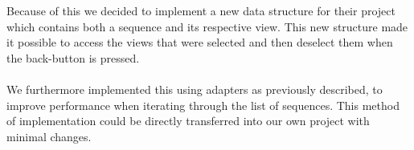 \\\\ 
Because of this we decided to implement a new data structure for their project which contains both a sequence and its respective view. This new structure made it possible to access the views that were selected and then deselect them when the back-button is pressed. 
\\\\
We furthermore implemented this using adapters as previously described, to improve performance when iterating through the list of sequences. This method of implementation could be directly transferred into our own project with minimal changes.

